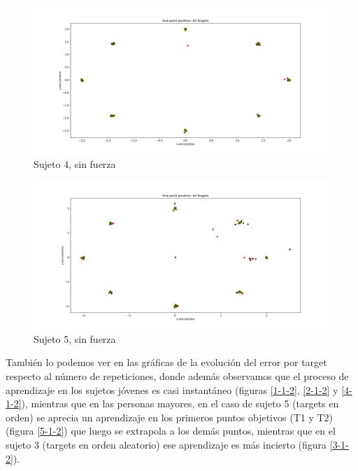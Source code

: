 \documentclass[a4paper,11pt, oneside]{book}
\begin{document}
\begin{figure}[H]
	\centering
	\includegraphics[width=\linewidth]{sujeto4/no_force/trayectorias_puntos}
	\caption{Sujeto 4, sin fuerza}
	\label{4-1-1}
\end{figure}
\begin{figure}[H]
	\centering
	\includegraphics[width=\linewidth]{sujeto5/no_force/trayectorias_puntos}
	\caption{Sujeto 5, sin fuerza}
	\label{5-1-1}
\end{figure}

También lo podemos ver en las gráficas de la evolución del error por target respecto al número de repeticiones, donde además observamos que el proceso de aprendizaje en los sujetos jóvenes es casi instantáneo (figuras \ref{1-1-2}, \ref{2-1-2} y \ref{4-1-2}), mientras que en las personas mayores, en el caso de sujeto 5 (targets en orden) se aprecia un aprendizaje en los primeros puntos objetivos (T1 y T2) (figura \ref{5-1-2}) que luego se extrapola a los demás puntos, mientras que en el sujeto 3 (targets en orden aleatorio) ese aprendizaje es más incierto (figura \ref{3-1-2}).
\end{document}

